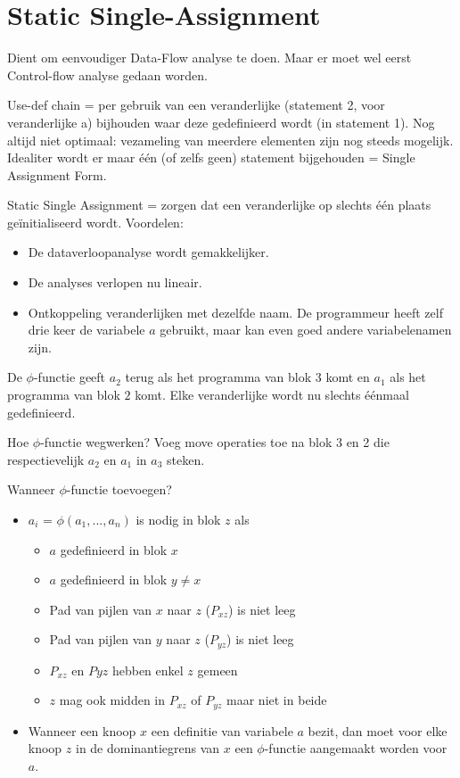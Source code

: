 \chapter{Static Single-Assignment}
Dient om eenvoudiger Data-Flow analyse te doen. Maar er moet wel eerst Control-flow analyse gedaan worden.


Use-def chain = per gebruik van een veranderlijke (statement 2, voor veranderlijke a) bijhouden waar deze gedefinieerd wordt (in statement 1). Nog altijd niet optimaal: vezameling van meerdere elementen zijn nog  steeds mogelijk. Idealiter wordt er maar één (of zelfs geen) statement bijgehouden = Single Assignment Form.


Static Single Assignment = zorgen dat een veranderlijke op slechts één plaats geïnitialiseerd wordt. Voordelen:
\begin{itemize}
	\item De dataverloopanalyse wordt gemakkelijker.
	\item De analyses verlopen nu lineair.
	\item Ontkoppeling veranderlijken met dezelfde naam. De programmeur heeft zelf drie keer de variabele $a$ gebruikt, maar kan even goed andere variabelenamen zijn.
\end{itemize}

De $\phi$-functie geeft $a_2$ terug als het programma van blok $3$ komt en $a_1$ als het programma van blok $2$ komt. Elke veranderlijke wordt nu slechts éénmaal gedefinieerd.

Hoe $\phi$-functie wegwerken? Voeg move operaties toe na blok 3 en 2 die respectievelijk $a_2$ en $a_1$ in $a_3$ steken.

Wanneer $\phi$-functie toevoegen?
\begin{itemize}
	\item $a_i$ = $\phi(a_1, ..., a_n)$ is nodig in blok $z$ als
	\begin{itemize}
		\item $a$ gedefinieerd in blok $x$
		\item $a$ gedefinieerd in blok $y \neq x$
		\item Pad van pijlen van $x$ naar $z$ ($P_{xz}$) is niet leeg
		\item Pad van pijlen van $y$ naar $z$ ($P_{yz}$) is niet leeg	
		\item $P_{xz}$ en $P{yz}$ hebben enkel $z$ gemeen
		\item $z$ mag ook midden in $P_{xz}$ of $P_{yz}$ maar niet in beide
		
	\end{itemize}
	\item Wanneer een knoop $x$ een definitie van variabele $a$ bezit, dan moet voor elke knoop $z$ in de dominantiegrens van $x$ een $\phi$-functie aangemaakt worden voor $a$.
\end{itemize}

